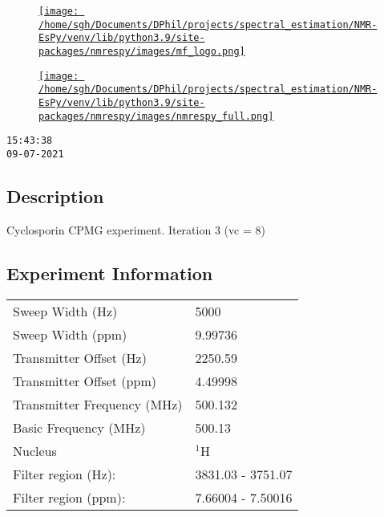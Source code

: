 \documentclass[8pt]{article}
\begin{document}
\begin{figure}[!ht]
\begin{minipage}[b][2.5cm][c]{.72\textwidth}
\href{http://foroozandeh.chem.ox.ac.uk/home}%
{\texttt{[image: /home/sgh/Documents/DPhil/projects/spectral\_estimation/NMR-EsPy/venv/lib/python3.9/site-packages/nmrespy/images/mf\_logo.png]}}
\end{minipage}
\begin{minipage}[b][2.5cm][c]{.27\textwidth}
\href{https://foroozandehgroup.github.io/NMR-EsPy}%
{\texttt{[image: /home/sgh/Documents/DPhil/projects/spectral\_estimation/NMR-EsPy/venv/lib/python3.9/site-packages/nmrespy/images/nmrespy\_full.png]}}
\end{minipage}
\end{figure}

\texttt{15:43:38\\09-07-2021}

\subsection*{Description}
Cyclosporin CPMG experiment.
Iteration 3 (vc = 8)

\subsection*{Experiment Information}
\hspace{-6pt}
\begin{tabular}{ll}
Sweep Width (Hz) & 5000 \\
Sweep Width (ppm) & 9.99736 \\
Transmitter Offset (Hz) & 2250.59 \\
Transmitter Offset (ppm) & 4.49998 \\
Transmitter Frequency (MHz) & 500.132 \\
Basic Frequency (MHz) & 500.13 \\
Nucleus & $^{1}$H \\
Filter region (Hz): & 3831.03 - 3751.07 \\
Filter region (ppm): & 7.66004 - 7.50016 \\

\end{tabular}
\end{document}

